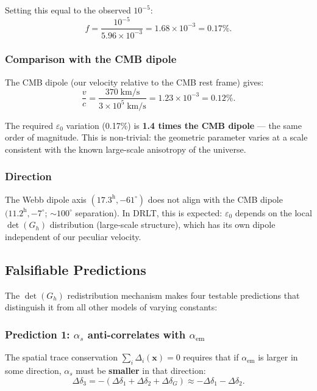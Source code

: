 \documentclass[12pt]{article}
\theoremstyle{remark}
\theoremstyle{definition}
\begin{document}
Setting this equal to the observed $10^{-5}$:
\begin{equation}
\boxed{f = \frac{10^{-5}}{5.96 \times 10^{-3}} = 1.68 \times 10^{-3} = 0.17\%.}
\end{equation}

\subsubsection{Comparison with the CMB dipole}

The CMB dipole (our velocity relative to the CMB rest frame) gives:
\begin{equation}
\frac{v}{c} = \frac{370\;\text{km/s}}{3 \times 10^5\;\text{km/s}} = 1.23 \times 10^{-3} = 0.12\%.
\end{equation}

The required $\varepsilon_0$ variation (0.17\%) is \textbf{1.4 times the CMB dipole} --- the same order of magnitude. This is non-trivial: the geometric parameter varies at a scale consistent with the known large-scale anisotropy of the universe.

\subsubsection{Direction}

The Webb dipole axis $(17.3^\text{h}, -61^\circ)$ does not align with the CMB dipole $(11.2^\text{h}, -7^\circ$; $\sim 100^\circ$ separation). In DRLT, this is expected: $\varepsilon_0$ depends on the local $\det(G_h)$ distribution (large-scale structure), which has its own dipole independent of our peculiar velocity.

\subsection{Falsifiable Predictions}

The $\det(G_h)$ redistribution mechanism makes four testable predictions that distinguish it from all other models of varying constants:

\subsubsection{Prediction 1: $\alpha_s$ anti-correlates with $\alpha_\text{em}$}

The spatial trace conservation $\sum_i \Delta_i(\mathbf{x}) = 0$ requires that if $\alpha_\text{em}$ is larger in some direction, $\alpha_s$ must be \textbf{smaller} in that direction:
\begin{equation}
\Delta\delta_3 = -(\Delta\delta_1 + \Delta\delta_2 + \Delta\delta_G) \approx -\Delta\delta_1 - \Delta\delta_2.
\end{equation}
\end{document}
